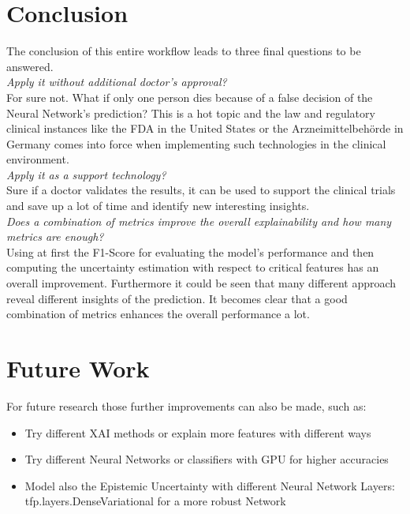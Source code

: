 \documentclass[journal]{IEEEtran}
\begin{document}
 
\section{Conclusion}
\noindent The conclusion of this entire workflow leads to three final questions to be answered. \\

\textit{Apply it without additional doctor’s approval?} \\

For sure not. What if only one person dies because of a false decision of the Neural Network's prediction? This is a hot topic and the law and regulatory clinical instances like the FDA in the United States or the Arzneimittelbehörde in Germany comes into force when implementing such technologies in the clinical environment. \\

\textit{Apply it as a support technology?} \\

Sure if a doctor validates the results, it can be used to support the clinical trials and save up a lot of time and identify new interesting insights. \\

\textit{Does a combination of metrics improve the overall explainability and how many metrics are enough?} \\ 

Using at first the F1-Score for evaluating the model's performance and then computing the uncertainty estimation with respect to critical features has an overall improvement. Furthermore it could be seen that many different approach reveal different insights of the prediction. It becomes clear that a good combination of metrics enhances the overall performance a lot.


\section{Future Work}
\noindent For future research those further improvements can also be made, such as: \\

\begin{itemize}
	\item Try different XAI methods or explain more features with different ways
	\item Try different Neural Networks or classifiers with GPU for higher accuracies
	\item Model also the Epistemic Uncertainty with different Neural Network Layers: tfp.layers.DenseVariational for a more robust Network
\end{itemize}
\end{document}
